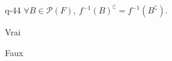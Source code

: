 \begin{truefalse}{q-44}
$\forall B\in\mathcal{P}(F),\ f^{-1}(B)^{\complement}=f^{-1}(B^{\complement})$.
\item* Vrai
\item Faux
\end{truefalse}

